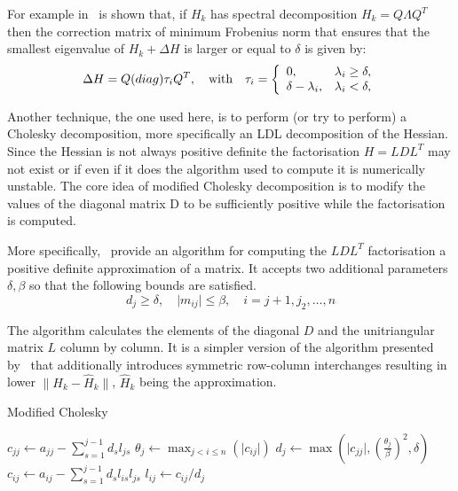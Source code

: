 \documentclass{article}
\begin{document}
    For example in~\cite{cheng1998modified} is shown that, if $H_k$ has spectral decomposition $H_k = Q \Lambda Q^T$ then the correction matrix of minimum Frobenius norm that ensures that the smallest eigenvalue of $H_k + \Delta H$ is larger or equal to $\delta$ is given by:
    \begin{equation*}
        \Delta H = Q \text(diag){\tau_i} Q^T, \quad \text{with} \quad \tau_i =
        \left\{
        \begin{array}{ll}
            0,                  & \lambda_i \geq \delta, \\
            \delta - \lambda_i, & \lambda_i < \delta,
        \end{array}
        \right.
    \end{equation*}

    Another technique, the one used here, is to perform (or try to perform) a Cholesky decomposition, more specifically an LDL decomposition of the Hessian.
    Since the Hessian is not always positive definite the factorisation $H = LDL^T$ may not exist or if even if it does the algorithm used to compute it is numerically unstable.
    The core idea of modified Cholesky decomposition is to modify the values of the diagonal matrix D to be sufficiently positive while the factorisation is computed.

    More specifically,~\cite{wright2006numerical} provide an algorithm for computing the $LDL^T$ factorisation a positive definite approximation of a matrix.
    It accepts two additional parameters $\delta, \beta$ so that the following bounds are satisfied.
    \begin{equation}
        d_j \geq \delta, \quad \lvert m_{ij} \rvert \leq \beta, \quad i = j+1, j_2, \dots, n
    \end{equation}

    The algorithm calculates the elements of the diagonal $D$ and the unitriangular matrix $L$ column by column.
    It is a simpler version of the algorithm presented by~\cite{gill2019practical} that additionally introduces symmetric row-column interchanges resulting in lower $ \lVert H_k - \hat{H}_k \rVert$, $\hat{H}_k$ being the approximation.

    \begin{algorithm}
        \caption{Modified Cholesky}
        \begin{algorithmic}
                \State $c_{jj} \gets a_{jj} - \sum_{s=1}^{j-1} d_s l_{js}$
                \State $\theta_j \gets \max_{j<i\leq n}(\lvert c_{ij} \rvert)$
                \State $d_j \gets  \max
                \left(
                \lvert c_{jj} \rvert,
                \left( \frac{\theta_j}{\beta} \right)^2,
                \delta \right)$
                    \State $c_{ij} \gets a_{ij} - \sum_{s=1}^{j-1} d_s l_{is} l_{js}$
                    \State $l_{ij} \gets c_{ij} / d_j$
                \EndFor
            \EndFor
        \end{algorithmic}
    \end{algorithm}
\end{document}
